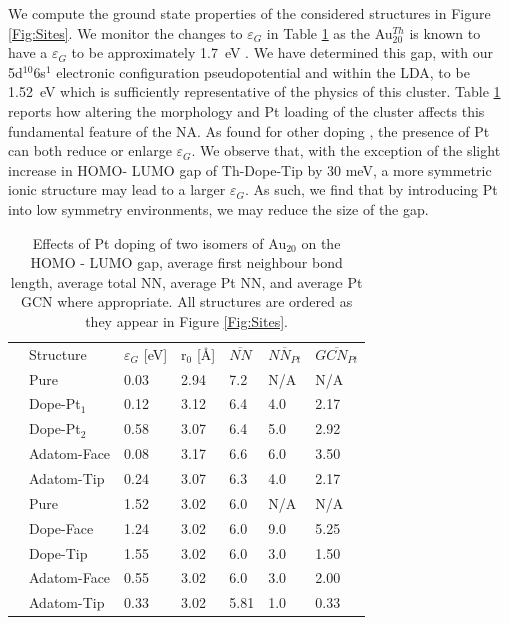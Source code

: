 We compute the ground state properties of the considered structures in Figure \ref{Fig:Sites}. We monitor the changes to $\varepsilon_{G}$ in Table \ref{tab:table} as the Au$_{20}^{Th}$ is known to have a $\varepsilon_{G}$ to be approximately 1.7~eV \cite{Au20Homo_Lumo,Baletto2015}. We have determined this gap, with our 5d$^{10}$6s$^{1}$ electronic configuration pseudopotential and within the LDA, to be 1.52~eV which is sufficiently representative of the physics of this cluster. Table \ref{tab:table} reports how altering the morphology and Pt loading of the cluster affects this fundamental feature of the NA. As found for other doping \cite{Baletto2015}, the presence of Pt can both reduce or enlarge $\varepsilon_{G}$. 
We observe that, with the exception of the slight increase in HOMO- LUMO gap of Th-Dope-Tip by 30 meV, a more symmetric ionic structure may lead to a larger $\varepsilon_{G}$. As such, we find that by introducing Pt into low symmetry environments, we may reduce the size of the gap.
%
\begin{table}[ht!]
\centering
\caption{Effects of Pt doping of two isomers of Au$_{20}$ on the HOMO - LUMO gap, average first neighbour bond length, average total NN, average Pt NN, and average Pt GCN where appropriate. All structures are ordered as they appear in Figure \ref{Fig:Sites}.}
\label{tab:table}
\begin{tabular}{lllllll}
\hline\noalign{\smallskip}
 & Structure & $\varepsilon_{G}$ [eV] & r$_{0}$ [\AA]& $\overline{NN}$ & $\overline{NN_{Pt}}$ & $\overline{GCN_{Pt}}$ \\
\noalign{\smallskip}\hline\noalign{\smallskip}
\multicolumn{1}{l|}{\multirow{5}{*}{C1}} & \multicolumn{1}{l|}{Pure} & 0.03 & 2.94 & 7.2 & N/A & N/A        \\
\multicolumn{1}{l|}{}                    & \multicolumn{1}{l|}{Dope-Pt$_1$} & 0.12 & 3.12 & 6.4 & 4.0 & 2.17 \\
\multicolumn{1}{l|}{}                    & \multicolumn{1}{l|}{Dope-Pt$_2$} & 0.58 & 3.07 & 6.4 & 5.0 & 2.92 \\
\multicolumn{1}{l|}{}                    & \multicolumn{1}{l|}{Adatom-Face} & 0.08 & 3.17 & 6.6 & 6.0 & 3.50 \\
\multicolumn{1}{l|}{}                    & \multicolumn{1}{l|}{Adatom-Tip}  & 0.24 & 3.07 & 6.3 & 4.0 & 2.17 \\
\noalign{\smallskip}\hline\noalign{\smallskip}
\multicolumn{1}{l|}{\multirow{6}{*}{Th}} & \multicolumn{1}{l|}{Pure} & 1.52 &  3.02 & 6.0 & N/A & N/A  \\
\multicolumn{1}{l|}{}                    & \multicolumn{1}{l|}{Dope-Face} & 1.24 & 3.02 & 6.0 & 9.0 & 5.25  \\
\multicolumn{1}{l|}{} &
\multicolumn{1}{l|}{{Dope-Tip}} & 1.55 & 3.02 &  6.0 & 3.0 & 1.50  \\
\multicolumn{1}{l|}{}                    & \multicolumn{1}{l|}{Adatom-Face}  & 0.55 & 3.02 & 6.0 & 3.0 &  2.00\\
\multicolumn{1}{l|}{} &
\multicolumn{1}{l|}{Adatom-Tip}  & 0.33 &  3.02 & 5.81 & 1.0 & 0.33 

\end{tabular}
\end{table}

